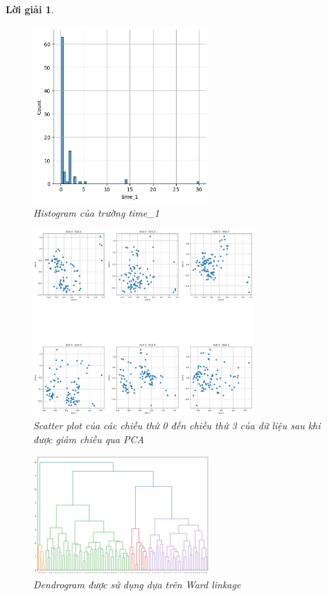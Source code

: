 \documentclass[14pt, a4paper]{article}
\theoremstyle{sltheorem}
\theoremstyle{soltheorem}
\newtheorem*{loigiai}{Lời giải}
\begin{document}
\begin{loigiai}
    \begin{figure}[h!]
        \centering
        \includegraphics[width=0.6\textwidth]{7.png}
        \caption{Histogram của trường time\_1}
        \label{fig:7}
    \end{figure}

    \begin{figure}[h!]
        \centering
        \includegraphics[width=0.75\textwidth]{figures/pca_scattering_4_dim.png}
        \caption{Scatter plot của các chiều thứ 0 đến chiều thứ 3 của dữ liệu sau khi được giảm chiều qua PCA}
        \label{fig:pca-scattering-4-dim}
    \end{figure}

    \begin{figure}[h!]
        \centering
        \includegraphics[width=0.6\textwidth]{figures/dendro_ward.png}
        \caption{Dendrogram được sử dụng dựa trên Ward linkage}
        \label{fig:dendro-ward}
    \end{figure}


\end{loigiai}
\end{document}
